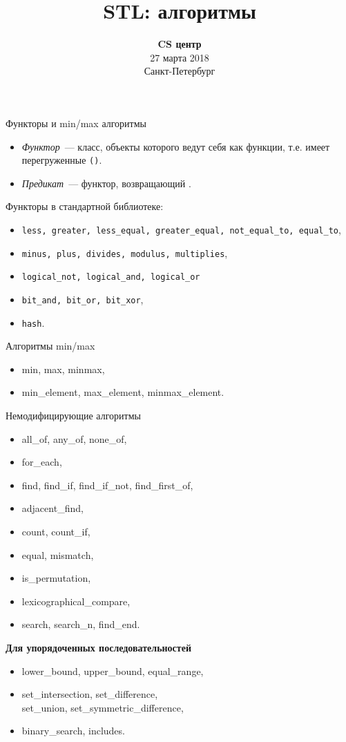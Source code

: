 \documentclass{beamer}
\title{STL: алгоритмы}
\date{
   \textbf{CS центр}\\
   27 марта 2018 \\
   Санкт-Петербург
}
\begin{document}
\begin{frame} 
  \titlepage
\end{frame}

\begin{frame}[fragile]{Функторы и min/max алгоритмы}
\begin{itemize}
    \item \emph{Функтор}~--- класс, объекты которого ведут себя как функции,
            т.е. имеет перегруженные \texttt{()}.
    \item\emph{Предикат}~--- функтор, возвращающий .
\end{itemize}
\pause
Функторы в стандартной библиотеке:
\begin{itemize}
    \item {\tt less, greater, less\_equal, greater\_equal, not\_equal\_to, equal\_to},
    \item {\tt minus, plus, divides, modulus, multiplies},
    \item {\tt logical\_not, logical\_and, logical\_or}
    \item {\tt bit\_and, bit\_or, bit\_xor},
    \item {\tt hash}.
\end{itemize}
\pause
\begin{block}{Алгоритмы min/max}
    \begin{itemize}\tt
    \item min, max, minmax,
    \item min\_element, max\_element, minmax\_element.
    \end{itemize}
\end{block}

\end{frame}

\begin{frame}[fragile]{Немодифицирующие алгоритмы}
\begin{itemize}
    \tt
    \item all\_of, any\_of, none\_of,
    \item for\_each,
    \item find, find\_if, find\_if\_not, find\_first\_of,
    \item adjacent\_find,
    \item count, count\_if,
    \item equal, mismatch,
    \item is\_permutation,
    \item lexicographical\_compare,
    \item search, search\_n, find\_end.
\end{itemize}    

\textbf{Для упорядоченных последовательностей}
\begin{itemize}
    \tt
    \item lower\_bound, upper\_bound, equal\_range,
    \item set\_intersection, set\_difference,\\set\_union, set\_symmetric\_difference,
    \item binary\_search, includes.
\end{itemize}
\end{frame}
\end{document}
